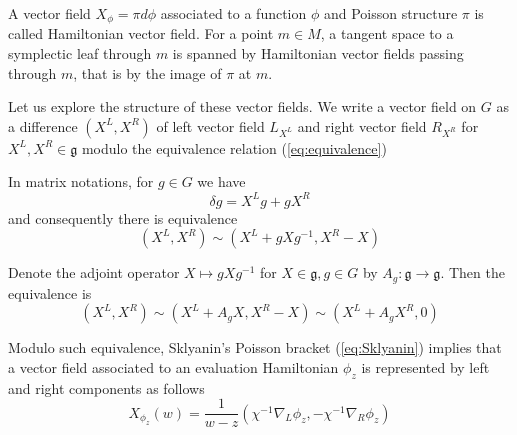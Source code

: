 \documentclass[11pt, oneside, reqno]{amsart}
\theoremstyle{definition} \newtheorem{definition}{Definition}[section]
\theoremstyle{definition} \newtheorem{remark}[definition]{Remark}
\theoremstyle{definition} \newtheorem{remarks}[definition]{Remarks}
\theoremstyle{definition} \newtheorem{question}[definition]{Question}
\theoremstyle{definition} \newtheorem*{note}{Note}
\theoremstyle{definition} \newtheorem{example}[definition]{Example}
\theoremstyle{definition} \newtheorem{examples}[definition]{Examples}
\renewcommand{\gg}{\mathfrak{g}}
\begin{document}
A vector field $X_{\phi} = \pi d \phi $ associated to a function $\phi$ and Poisson structure $\pi$ is called Hamiltonian vector field. For a point $m \in M$, a tangent space to a symplectic
leaf through $m$ is spanned by Hamiltonian vector fields passing through $m$, 
that is by the image of $\pi$ at $m$.







Let us explore the structure of these vector fields. We write a vector field on $G$
as a difference $(X^L, X^R)$  of left vector field $L_{X^L}$ and right vector field $R_{X^R}$
for $X^L, X^R \in \gg$ modulo the equivalence relation (\ref{eq:equivalence})

In matrix notations, for $g \in G$ we have
\begin{equation}
  \delta g = X^L g + g X^R 
\end{equation}
and consequently there is equivalence 
\begin{equation}
\label{eq:equivalence0}
  (X^L, X^R) \sim (X^L + g X g^{-1}, X^R -  X)
\end{equation}

Denote the adjoint operator $X \mapsto g X g^{-1}$ for $X \in \gg, g \in G$ by $A_{g}: \gg \to \gg$.
Then the equivalence is
\begin{equation}
\label{eq:equivalence}
    (X^L, X^R) \sim (X^L + A_{g} X , X^{R} -  X) \sim (X^{L} +  A_{g} X^{R}, 0) 
\end{equation}


Modulo such equivalence, Sklyanin's Poisson bracket (\ref{eq:Sklyanin}) implies
that a vector field associated to an evaluation Hamiltonian $\phi_z$ is represented by
left and right components as follows 
\begin{equation}
\label{eq:Xphiz}
X_{\phi_z} (w) =  \frac{1}{w - z} ( \chi^{-1} \nabla_{L} \phi_z,  - \chi^{-1}\nabla_{R} \phi_{z})
\end{equation}
\end{document}

